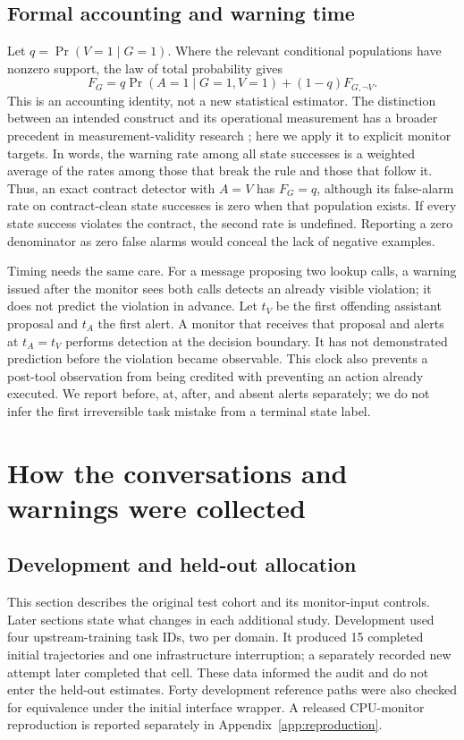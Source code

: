 \documentclass[10pt]{article}
\begin{document}
\subsection{Formal accounting and warning time}
Let $q=\Pr(V=1\mid G=1)$. Where the relevant conditional populations have nonzero support, the law of total probability gives
\begin{equation}
 F_G=q\Pr(A=1\mid G=1,V=1)+(1-q)F_{G,\neg V}.
 \label{eq:decomposition}
\end{equation}
This is an accounting identity, not a new statistical estimator. The distinction between an intended construct and its operational measurement has a broader precedent in measurement-validity research \citep{jacobs2021measurement}; here we apply it to explicit monitor targets. In words, the warning rate among all state successes is a weighted average of the rates among those that break the rule and those that follow it. Thus, an exact contract detector with $A=V$ has $F_G=q$, although its false-alarm rate on contract-clean state successes is zero when that population exists. If every state success violates the contract, the second rate is undefined. Reporting a zero denominator as zero false alarms would conceal the lack of negative examples.

Timing needs the same care. For a message proposing two lookup calls, a warning issued after the monitor sees both calls detects an already visible violation; it does not predict the violation in advance. Let $t_V$ be the first offending assistant proposal and $t_A$ the first alert. A monitor that receives that proposal and alerts at $t_A=t_V$ performs detection at the decision boundary. It has not demonstrated prediction before the violation became observable. This clock also prevents a post-tool observation from being credited with preventing an action already executed. We report before, at, after, and absent alerts separately; we do not infer the first irreversible task mistake from a terminal state label.

\section{How the conversations and warnings were collected}
\label{sec:protocol}
\subsection{Development and held-out allocation}
This section describes the original test cohort and its monitor-input controls. Later sections state what changes in each additional study. Development used four upstream-training task IDs, two per domain. It produced 15 completed initial trajectories and one infrastructure interruption; a separately recorded new attempt later completed that cell. These data informed the audit and do not enter the held-out estimates. Forty development reference paths were also checked for equivalence under the initial interface wrapper. A released CPU-monitor reproduction is reported separately in Appendix~\ref{app:reproduction}.
\end{document}
